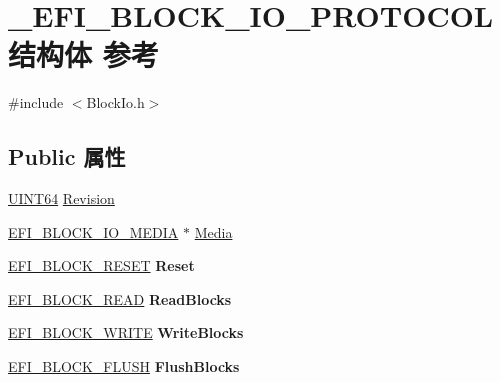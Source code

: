 \hypertarget{struct___e_f_i___b_l_o_c_k___i_o___p_r_o_t_o_c_o_l}{}\section{\+\_\+\+E\+F\+I\+\_\+\+B\+L\+O\+C\+K\+\_\+\+I\+O\+\_\+\+P\+R\+O\+T\+O\+C\+O\+L结构体 参考}
\label{struct___e_f_i___b_l_o_c_k___i_o___p_r_o_t_o_c_o_l}


{\ttfamily \#include $<$Block\+Io.\+h$>$}

\subsection*{Public 属性}
\begin{DoxyCompactItemize}
\item 
\hyperlink{_processor_bind_8h_a57be03562867144161c1bfee95ca8f7c}{U\+I\+N\+T64} \hyperlink{struct___e_f_i___b_l_o_c_k___i_o___p_r_o_t_o_c_o_l_a8ebcb5fbf96bc58b1c54e154e292c372}{Revision}
\item 
\hyperlink{struct_e_f_i___b_l_o_c_k___i_o___m_e_d_i_a}{E\+F\+I\+\_\+\+B\+L\+O\+C\+K\+\_\+\+I\+O\+\_\+\+M\+E\+D\+IA} $\ast$ \hyperlink{struct___e_f_i___b_l_o_c_k___i_o___p_r_o_t_o_c_o_l_a3a970fbdbdf06f9e9dce16a80dd2ec96}{Media}
\item 
\mbox{\label{struct___e_f_i___b_l_o_c_k___i_o___p_r_o_t_o_c_o_l_aae8d29d7d231520e6fc59f6f3fff987b}} 
\hyperlink{_block_io_8h_a0759839550439752414f040c3a99c9dd}{E\+F\+I\+\_\+\+B\+L\+O\+C\+K\+\_\+\+R\+E\+S\+ET} {\bfseries Reset}
\item 
\mbox{\label{struct___e_f_i___b_l_o_c_k___i_o___p_r_o_t_o_c_o_l_a94576f142429c0d70f1b9c063596d5df}} 
\hyperlink{_block_io_8h_a3dc77e730fb508d8f9d1cde9e2ee77ed}{E\+F\+I\+\_\+\+B\+L\+O\+C\+K\+\_\+\+R\+E\+AD} {\bfseries Read\+Blocks}
\item 
\mbox{\label{struct___e_f_i___b_l_o_c_k___i_o___p_r_o_t_o_c_o_l_a9b55d71334035dcdcc1eee55e7e3553d}} 
\hyperlink{_block_io_8h_ae4a7080b08ce599b34671558ad06623e}{E\+F\+I\+\_\+\+B\+L\+O\+C\+K\+\_\+\+W\+R\+I\+TE} {\bfseries Write\+Blocks}
\item 
\mbox{\label{struct___e_f_i___b_l_o_c_k___i_o___p_r_o_t_o_c_o_l_adb1c8799f152b85cee2a8b5b51be00aa}} 
\hyperlink{_block_io_8h_ae9a0709c199ae5450800dc53e98ea409}{E\+F\+I\+\_\+\+B\+L\+O\+C\+K\+\_\+\+F\+L\+U\+SH} {\bfseries Flush\+Blocks}
\end{DoxyCompactItemize}


